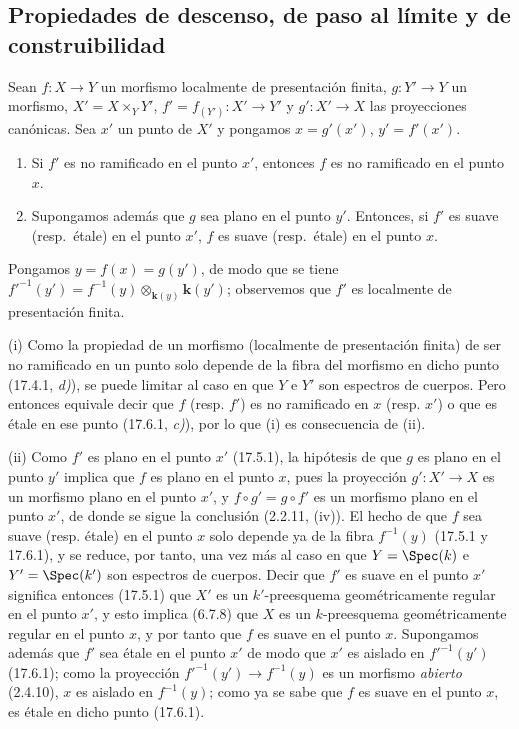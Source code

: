 \subsection{Propiedades de descenso, de paso al límite y de construibilidad}
\label{subsection:IV.17.7}
\label{IV.17.7}

\begin{proposition}[17.7.1]
\label{IV.17.7.1}
Sean $f:X\to Y$ un morfismo localmente de presentación finita, $g:Y'\to Y$ un morfismo, $X'=X\times_Y Y'$, $f'=f_{(Y')}:X'\to Y'$ y $g':X'\to X$ las proyecciones canónicas. Sea $x'$ un punto de $X'$ y pongamos $x=g'(x')$, $y'=f'(x')$.
\begin{enumerate}
  \item[\textup{(i)}] Si $f'$ es no ramificado en el punto $x'$, entonces $f$ es no ramificado en el punto $x$.
  \item[\textup{(ii)}] Supongamos además que $g$ sea plano en el punto $y'$. Entonces, si $f'$ es suave \textup{(resp.}\ étale\textup{)} en el punto $x'$, $f$ es suave \textup{(resp.}\ étale\textup{)} en el punto $x$.
\end{enumerate}
\end{proposition}

Pongamos $y=f(x)=g(y')$, de modo que se tiene $f'^{-1}(y')=f^{-1}(y)\otimes_{\mathbf{k}(y)}\boldsymbol{k}(y')$; observemos que $f'$ es localmente de presentación finita.

(i) Como la propiedad de un morfismo (localmente de presentación finita) de ser no ramificado en un punto solo depende de la fibra del morfismo en dicho punto (17.4.1, \emph{d)}), se puede limitar al caso en que $Y$ e $Y'$ son espectros de cuerpos. Pero entonces equivale decir que $f$ (resp. $f'$) es no ramificado en $x$ (resp. $x'$) o que es étale en ese punto (17.6.1, \emph{c)}), por lo que (i) es consecuencia de (ii).

(ii) Como $f'$ es plano en el punto $x'$ (17.5.1), la hipótesis de que $g$ es plano en el punto $y'$ implica que $f$ es plano en el punto $x$, pues la proyección $g':X'\to X$ es un morfismo plano en el punto $x'$, y $f\circ g'=g\circ f'$ es un morfismo plano en el punto $x'$, de donde se sigue la conclusión (2.2.11, (iv)). El hecho de que $f$ sea suave (resp. étale) en el punto $x$ solo depende ya de la fibra $f^{-1}(y)$ (17.5.1 y 17.6.1), y se reduce, por tanto, una vez más al caso en que $Y=\Spec(k)$ e $Y'=\Spec(k')$ son espectros de cuerpos. Decir que $f'$ es suave en el punto $x'$ significa entonces (17.5.1) que $X'$ es un $k'$-preesquema geométricamente regular en el punto $x'$, y esto implica (6.7.8) que $X$ es un $k$-preesquema geométricamente regular en el punto $x$, y por tanto que $f$ es suave en el punto $x$. Supongamos además que $f'$ sea étale en el punto $x'$ de modo que $x'$ es aislado en $f'^{-1}(y')$ (17.6.1); como la proyección $f'^{-1}(y')\to f^{-1}(y)$ es un morfismo \emph{abierto} (2.4.10), $x$ es aislado en $f^{-1}(y)$; como ya se sabe que $f$ es suave en el punto $x$, es étale en dicho punto (17.6.1).

